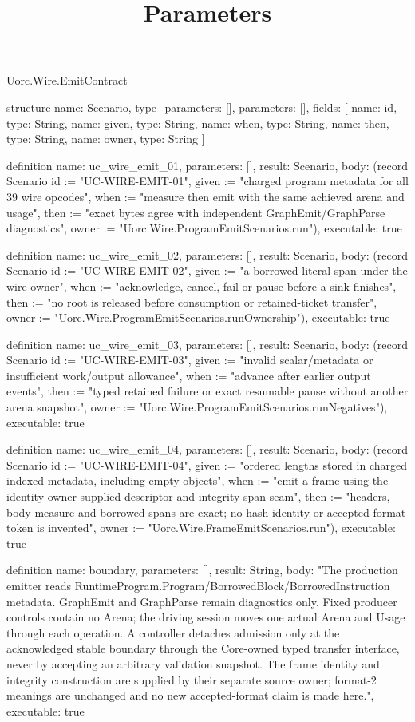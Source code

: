\begin{lexlean}{Uorc.Wire.EmitContract}
\title{Parameters}
\begin{semanticmodule}
structure{
  name: Scenario,
  type_parameters: [],
  parameters: [],
  fields: [
    {name: id, type: String},
    {name: given, type: String},
    {name: when, type: String},
    {name: then, type: String},
    {name: owner, type: String}
  ]
}

definition{
  name: uc_wire_emit_01,
  parameters: [],
  result: Scenario,
  body: (record Scenario {id := "UC-WIRE-EMIT-01", given := "charged program metadata for all 39 wire opcodes", when := "measure then emit with the same achieved arena and usage", then := "exact bytes agree with independent GraphEmit/GraphParse diagnostics", owner := "Uorc.Wire.ProgramEmitScenarios.run"}),
  executable: true
}

definition{
  name: uc_wire_emit_02,
  parameters: [],
  result: Scenario,
  body: (record Scenario {id := "UC-WIRE-EMIT-02", given := "a borrowed literal span under the wire owner", when := "acknowledge, cancel, fail or pause before a sink finishes", then := "no root is released before consumption or retained-ticket transfer", owner := "Uorc.Wire.ProgramEmitScenarios.runOwnership"}),
  executable: true
}

definition{
  name: uc_wire_emit_03,
  parameters: [],
  result: Scenario,
  body: (record Scenario {id := "UC-WIRE-EMIT-03", given := "invalid scalar/metadata or insufficient work/output allowance", when := "advance after earlier output events", then := "typed retained failure or exact resumable pause without another arena snapshot", owner := "Uorc.Wire.ProgramEmitScenarios.runNegatives"}),
  executable: true
}

definition{
  name: uc_wire_emit_04,
  parameters: [],
  result: Scenario,
  body: (record Scenario {id := "UC-WIRE-EMIT-04", given := "ordered lengths stored in charged indexed metadata, including empty objects", when := "emit a frame using the identity owner supplied descriptor and integrity span seam", then := "headers, body measure and borrowed spans are exact; no hash identity or accepted-format token is invented", owner := "Uorc.Wire.FrameEmitScenarios.run"}),
  executable: true
}

definition{
  name: boundary,
  parameters: [],
  result: String,
  body: "The production emitter reads RuntimeProgram.Program/BorrowedBlock/BorrowedInstruction metadata. GraphEmit and GraphParse remain diagnostics only. Fixed producer controls contain no Arena; the driving session moves one actual Arena and Usage through each operation. A controller detaches admission only at the acknowledged stable boundary through the Core-owned typed transfer interface, never by accepting an arbitrary validation snapshot. The frame identity and integrity construction are supplied by their separate source owner; format-2 meanings are unchanged and no new accepted-format claim is made here.",
  executable: true
}
\end{semanticmodule}
\end{lexlean}
